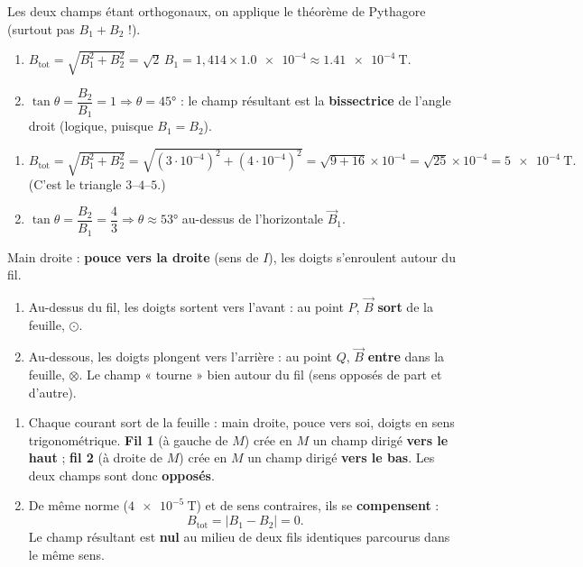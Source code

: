 \documentclass[11pt,a4paper]{article}
\newcommand{\vv}[1]{\vec{#1}}\newcommand{\ds}{\displaystyle}
\begin{document}
\begin{corrige}
Les deux champs étant orthogonaux, on applique le théorème de Pythagore (surtout pas $B_1+B_2$ !).
\begin{enumerate}[label=\alph*)]
  \item $B_{\text{tot}}=\sqrt{B_1^2+B_2^2}=\sqrt{2}\,B_1=1{,}414\times\num{1.0e-4}
        \approx\qty{1.41e-4}{\tesla}.$
  \item $\tan\theta=\dfrac{B_2}{B_1}=1 \Rightarrow \theta=\ang{45}$ : le champ résultant est la
        \textbf{bissectrice} de l'angle droit (logique, puisque $B_1=B_2$).
\end{enumerate}
\end{corrige}

\begin{corrige}
\begin{enumerate}[label=\alph*)]
  \item $B_{\text{tot}}=\sqrt{B_1^2+B_2^2}=\sqrt{(3\cdot10^{-4})^2+(4\cdot10^{-4})^2}
        =\sqrt{9+16}\times10^{-4}=\sqrt{25}\times10^{-4}=\qty{5e-4}{\tesla}.$
        (C'est le triangle $3$–$4$–$5$.)
  \item $\tan\theta=\dfrac{B_2}{B_1}=\dfrac{4}{3}\Rightarrow \theta\approx\ang{53}$ au-dessus de
        l'horizontale $\vv{B}_1$.
\end{enumerate}
\end{corrige}

\begin{corrige}
Main droite : \textbf{pouce vers la droite} (sens de $I$), les doigts s'enroulent autour du fil.
\begin{enumerate}[label=\alph*)]
  \item Au-dessus du fil, les doigts sortent vers l'avant : au point $P$, $\vv{B}$ \textbf{sort} de la
        feuille, $\odot$.
  \item Au-dessous, les doigts plongent vers l'arrière : au point $Q$, $\vv{B}$ \textbf{entre} dans la
        feuille, $\otimes$. Le champ « tourne » bien autour du fil (sens opposés de part et d'autre).
\end{enumerate}
\end{corrige}

\begin{corrige}
\begin{enumerate}[label=\alph*)]
  \item Chaque courant sort de la feuille : main droite, pouce vers soi, doigts en sens
        trigonométrique. \textbf{Fil 1} (à gauche de $M$) crée en $M$ un champ dirigé \textbf{vers le
        haut} ; \textbf{fil 2} (à droite de $M$) crée en $M$ un champ dirigé \textbf{vers le bas}.
        Les deux champs sont donc \textbf{opposés}.
  \item De même norme ($\qty{4e-5}{\tesla}$) et de sens contraires, ils se \textbf{compensent} :
        \[ B_{\text{tot}}=|B_1-B_2|=0. \]
        Le champ résultant est \textbf{nul} au milieu de deux fils identiques parcourus dans le même sens.
\end{enumerate}
\end{corrige}
\end{document}
